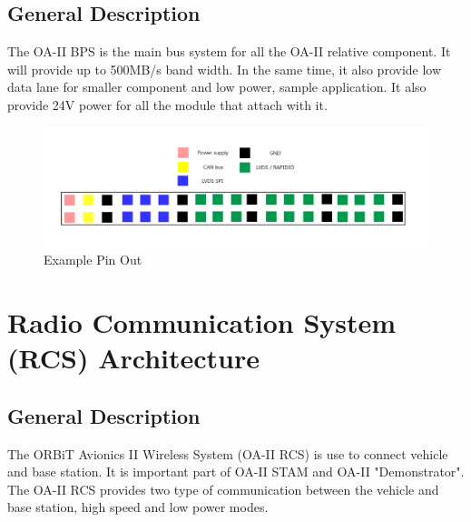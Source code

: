 \documentclass[12pt,article]{memoir}
\begin{document}
\section{General Description}
The OA-II BPS is the main bus system for all the OA-II relative component. It will provide up to 500MB/s band width. In the same time, it also provide low data lane for smaller component and low power, sample application. It also provide 24V power for all the module that attach with it.
\begin{figure}[h]
\includegraphics[width=\textwidth]{ES00002_BPS_Pin.png}
 \caption{Example Pin Out}	
\end{figure}

\newpage

\chapter{Radio Communication System (RCS) Architecture}
\section{General Description}
The ORBiT Avionics II Wireless System (OA-II RCS) is use to connect vehicle and base station. It is important part of OA-II STAM and OA-II "Demonstrator". The OA-II RCS provides two type of communication between the vehicle and base station, high speed and low power modes.
\end{document}
